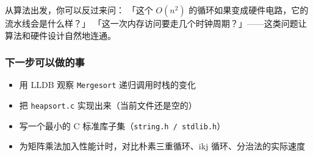 从算法出发，你可以反过来问：
「这个 \(O(n^2)\) 的循环如果变成硬件电路，它的流水线会是什么样？」
「这一次内存访问要走几个时钟周期？」——这类问题让算法和硬件设计自然地连通。

\subsubsection{下一步可以做的事}

\begin{itemize}
    \item 用 LLDB 观察 \texttt{Mergesort} 递归调用时栈的变化
    \item 把 \texttt{heapsort.c} 实现出来（当前文件还是空的）
    \item 写一个最小的 C 标准库子集（\texttt{string.h / stdlib.h}）
    \item 为矩阵乘法加入性能计时，对比朴素三重循环、ikj 循环、分治法的实际速度
\end{itemize}
